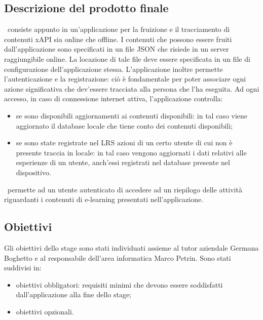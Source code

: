 \documentclass[../Tesi.tex]{subfiles}
\begin{document}
	\subsection{Descrizione del prodotto finale}
	\app\ consiste appunto in un'applicazione per la fruizione e il tracciamento di contenuti xAPI sia online che offline. I contenuti che possono essere fruiti dall'applicazione sono specificati in un file JSON che risiede in un server raggiungibile online. La locazione di tale file deve essere specificata in un file di configurazione dell'applicazione stessa. L'applicazione inoltre permette l'autenticazione e la registrazione: ciò è fondamentale per poter associare ogni azione significativa che dev'essere tracciata alla persona che l'ha eseguita. Ad ogni accesso, in caso di connessione internet attiva, l'applicazione controlla:
	\begin{itemize}
		\item se sono disponibili aggiornamenti ai contenuti disponibili: in tal caso viene aggiornato il database locale che tiene conto dei contenuti disponibili;
		\item se sono state registrate nel LRS azioni di un certo utente di cui non è presente traccia in locale: in tal caso vengono aggiornati i dati relativi alle esperienze di un utente, anch'essi registrati nel database presente nel dispositivo.
	\end{itemize} 
	\app\ permette ad un utente autenticato di accedere ad un riepilogo delle attività riguardanti i contenuti di e-learning presentati nell'applicazione. 

	\subsection{Obiettivi}
		Gli obiettivi dello stage sono stati individuati assieme al tutor aziendale Germana Boghetto e al responsabile dell'area informatica Marco Petrin. Sono stati suddivisi in:
		\begin{itemize}
			\item obiettivi obbligatori: requisiti minimi che devono essere soddisfatti dall'applicazione alla fine dello stage;
			\item obiettivi opzionali.
		\end{itemize}
\end{document}
